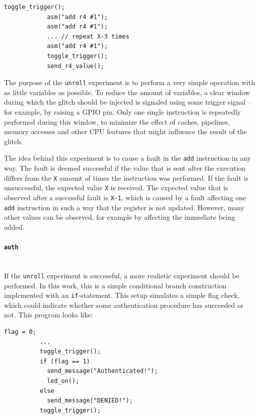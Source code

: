 \documentclass[10pt]{article}
\newcommand{\unroll}{\texttt{unroll}\xspace}
\newcommand{\auth}{\texttt{auth}\xspace}
\begin{document}
          \begin{lstlisting}[label=lst:unroll, caption=Unroll experiment sample code]
            toggle_trigger();
            asm("add r4 #1");
            asm("add r4 #1");
            ... // repeat X-3 times
            asm("add r4 #1");
            toggle_trigger();
            send_r4_value();
          \end{lstlisting}

          \noindent The purpose of the \unroll experiment is to perform a very simple operation with as little variables as possible. To reduce the amount of variables, a clear window during which the glitch should be injected is signaled using some trigger signal -- for example, by raising a GPIO pin. Only one single instruction is repeatedly performed during this window, to minimize the effect of caches, pipelines, memory accesses and other CPU features that might influence the result of the glitch.

          The idea behind this experiment is to cause a fault in the \texttt{add} instruction in any way. The fault is deemed successful if the value that is sent after the execution differs from the \texttt{X} amount of times the instruction was performed. If the fault is unsuccessful, the expected value \texttt{X} is received. The expected value that is observed after a successful fault is \texttt{X-1}, which is caused by a fault affecting one \texttt{add} instruction in such a way that the register is not updated. However, many other values can be observed, for example by affecting the immediate being added.


      \paragraph*{\auth} \ \\ \noindent
        If the \unroll experiment is successful, a more realistic experiment should be performed. In this work, this is a simple conditional branch construction implemented with an \texttt{if}-statement. This setup simulates a simple flag check, which could indicate whether some authentication procedure has succeeded or not. This program looks like:

        \begin{lstlisting}[label=lst:auth, caption=Authentication experiment sample code]
          flag = 0;
          ...
          toggle_trigger();
          if (flag == 1)
            send_message("Authenticated!");
            led_on();
          else
            send_message("DENIED!");
          toggle_trigger();
        \end{lstlisting}
\end{document}
